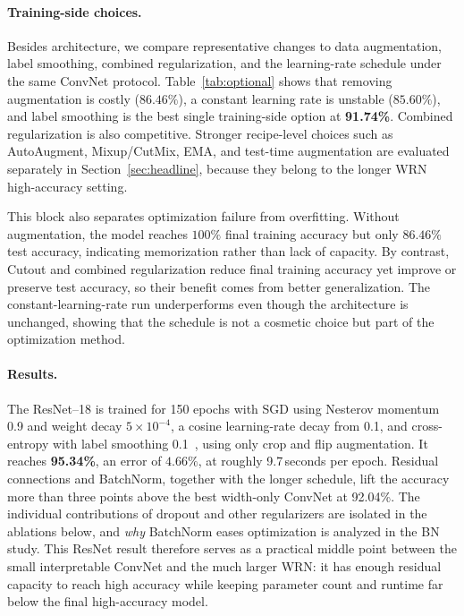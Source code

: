 \documentclass[11pt]{article}
\newcommand{\baseAcc}{95.34}     %
\newcommand{\bestEpochTime}{9.7}
\newcommand{\convAcc}{92.04}     %
\begin{document}
\paragraph{Training-side choices.} Besides architecture, we compare
representative changes to data augmentation, label
smoothing, combined regularization, and the learning-rate schedule under the
same ConvNet protocol. Table~\ref{tab:optional} shows that removing
augmentation is costly ($86.46\%$), a constant learning rate is unstable
($85.60\%$), and label smoothing is the best single training-side option at
\textbf{91.74\%}. Combined regularization is also competitive. Stronger
recipe-level choices such as AutoAugment, Mixup/CutMix, EMA, and test-time
augmentation are evaluated separately in Section~\ref{sec:headline}, because
they belong to the longer WRN high-accuracy setting.

This block also separates optimization failure from overfitting. Without
augmentation, the model reaches $100\%$ final training accuracy but only
$86.46\%$ test accuracy, indicating memorization rather than lack of capacity.
By contrast, Cutout and combined regularization reduce final training accuracy
yet improve or preserve test accuracy, so their benefit comes from better
generalization. The constant-learning-rate run underperforms even though the
architecture is unchanged, showing that the schedule is not a cosmetic choice
but part of the optimization method.

\paragraph{Results.} The ResNet--18 is trained for 150 epochs with SGD using
Nesterov momentum 0.9 and weight decay $5\times10^{-4}$, a cosine
learning-rate decay from 0.1, and cross-entropy with label smoothing
0.1~\citep{szegedy2016rethinking}, using only crop and flip augmentation. It
reaches \textbf{\baseAcc\%}, an error of $4.66\%$, at roughly
\bestEpochTime\,seconds per epoch. Residual
connections and BatchNorm, together with the longer schedule, lift the
accuracy more than three points above the best width-only ConvNet at \convAcc\%.
The individual contributions of dropout and other regularizers are isolated in
the ablations below, and \emph{why} BatchNorm eases optimization is analyzed
in the BN study.
This ResNet result therefore serves as a practical middle point between the
small interpretable ConvNet and the much larger WRN: it has enough residual
capacity to reach high accuracy while keeping parameter count and runtime far
below the final high-accuracy model.
\end{document}
